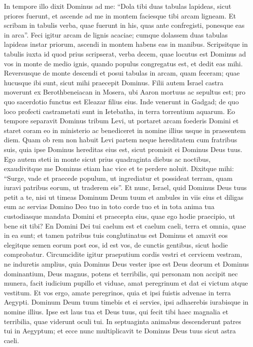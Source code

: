 \begin{biblechapter}
\begin{biblechapter}
\begin{biblechapter}
\begin{biblechapter}
\begin{biblechapter}
\begin{biblechapter}
\begin{biblechapter}
\begin{biblechapter}
\begin{biblechapter}
\begin{biblechapter}
\verse In tempore illo dixit Dominus ad me: “Dola tibi duas tabulas lapideas, sicut priores fuerunt, et ascende ad me in montem faciesque tibi arcam ligneam. 
\verse Et scribam in tabulis verba, quae fuerunt in his, quas ante confregisti, ponesque eas in arca”. 
\verse Feci igitur arcam de lignis acaciae; cumque dolassem duas tabulas lapideas instar priorum, ascendi in montem habens eas in manibus. 
\verse Scripsitque in tabulis iuxta id quod prius scripserat, verba decem, quae locutus est Dominus ad vos in monte de medio ignis, quando populus congregatus est, et dedit eas mihi. 
\verse Reversusque de monte descendi et posui tabulas in arcam, quam feceram; quae hucusque ibi sunt, sicut mihi praecepit Dominus.
 \verse Filii autem Israel castra moverunt ex Berothbeneiacan in Mosera, ubi Aaron mortuus ac sepultus est; pro quo sacerdotio functus est Eleazar filius eius. 
 \verse Inde venerunt in Gadgad; de quo loco profecti castrametati sunt in Ietebatha, in terra torrentium aquarum.
 \verse Eo tempore separavit Dominus tribum Levi, ut portaret arcam foederis Domini et staret coram eo in ministerio ac benediceret in nomine illius usque in praesentem diem. 
\verse Quam ob rem non habuit Levi partem neque hereditatem cum fratribus suis, quia ipse Dominus hereditas eius est, sicut promisit ei Dominus Deus tuus.
 \verse Ego autem steti in monte sicut prius quadraginta diebus ac noctibus, exaudivitque me Dominus etiam hac vice et te perdere noluit.
 \verse Dixitque mihi: “Surge, vade et praecede populum, ut ingrediatur et possideat terram, quam iuravi patribus eorum, ut traderem eis”.
 \verse Et nunc, Israel, quid Dominus Deus tuus petit a te, nisi ut timeas Dominum Deum tuum et ambules in viis eius et diligas eum ac servias Domino Deo tuo in toto corde tuo et in tota anima tua 
\verse custodiasque mandata Domini et praecepta eius, quae ego hodie praecipio, ut bene sit tibi? 
\verse En Domini Dei tui caelum est et caelum caeli, terra et omnia, quae in ea sunt; 
\verse et tamen patribus tuis conglutinatus est Dominus et amavit eos elegitque semen eorum post eos, id est vos, de cunctis gentibus, sicut hodie comprobatur.
 \verse Circumcidite igitur praeputium cordis vestri et cervicem vestram, ne induretis amplius, 
\verse quia Dominus Deus vester ipse est Deus deorum et Dominus dominantium, Deus magnus, potens et terribilis, qui personam non accipit nec munera, 
\verse facit iudicium pupillo et viduae, amat peregrinum et dat ei victum atque vestitum. 
\verse Et vos ergo, amate peregrinos, quia et ipsi fuistis advenae in terra Aegypti. 
\verse Dominum Deum tuum timebis et ei servies, ipsi adhaerebis iurabisque in nomine illius. 
\verse Ipse est laus tua et Deus tuus, qui fecit tibi haec magnalia et terribilia, quae viderunt oculi tui. 
\verse In septuaginta animabus descenderunt patres tui in Aegyptum; et ecce nunc multiplicavit te Dominus Deus tuus sicut astra caeli.
 

\end{biblechapter}
\end{biblechapter}
\end{biblechapter}
\end{biblechapter}
\end{biblechapter}
\end{biblechapter}
\end{biblechapter}
\end{biblechapter}
\end{biblechapter}
\end{biblechapter}
